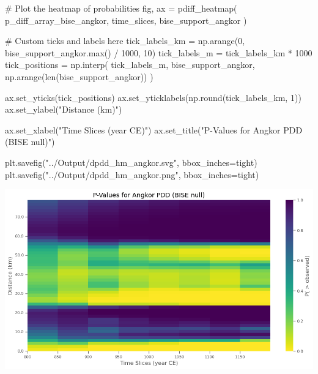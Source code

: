 \documentclass[
  11pt,
  letterpaper,
  DIV=11,
  numbers=noendperiod]{scrartcl}
\newenvironment{Shaded}{\begin{snugshade}}{\end{snugshade}}
\newcommand{\BuiltInTok}[1]{\textcolor[rgb]{0.00,0.23,0.31}{#1}}
\newcommand{\CommentTok}[1]{\textcolor[rgb]{0.37,0.37,0.37}{#1}}
\newcommand{\DecValTok}[1]{\textcolor[rgb]{0.68,0.00,0.00}{#1}}
\newcommand{\NormalTok}[1]{\textcolor[rgb]{0.00,0.23,0.31}{#1}}
\newcommand{\OperatorTok}[1]{\textcolor[rgb]{0.37,0.37,0.37}{#1}}
\newcommand{\StringTok}[1]{\textcolor[rgb]{0.13,0.47,0.30}{#1}}
\begin{document}
\begin{Shaded}
\begin{Highlighting}[]
\CommentTok{\# Plot the heatmap of probabilities}
\NormalTok{fig, ax }\OperatorTok{=}\NormalTok{ pdiff\_heatmap(}
\NormalTok{    p\_diff\_array\_bise\_angkor,}
\NormalTok{    time\_slices,}
\NormalTok{    bise\_support\_angkor}
\NormalTok{)}

\CommentTok{\# Custom ticks and labels here}
\NormalTok{tick\_labels\_km }\OperatorTok{=}\NormalTok{ np.arange(}\DecValTok{0}\NormalTok{, bise\_support\_angkor.}\BuiltInTok{max}\NormalTok{() }\OperatorTok{/} \DecValTok{1000}\NormalTok{, }\DecValTok{10}\NormalTok{)}
\NormalTok{tick\_labels\_m }\OperatorTok{=}\NormalTok{ tick\_labels\_km }\OperatorTok{*} \DecValTok{1000}
\NormalTok{tick\_positions }\OperatorTok{=}\NormalTok{ np.interp(}
\NormalTok{    tick\_labels\_m, }
\NormalTok{    bise\_support\_angkor, }
\NormalTok{    np.arange(}\BuiltInTok{len}\NormalTok{(bise\_support\_angkor))}
\NormalTok{)}

\NormalTok{ax.set\_yticks(tick\_positions)}
\NormalTok{ax.set\_yticklabels(np.}\BuiltInTok{round}\NormalTok{(tick\_labels\_km, }\DecValTok{1}\NormalTok{))}
\NormalTok{ax.set\_ylabel(}\StringTok{"Distance (km)"}\NormalTok{)}

\NormalTok{ax.set\_xlabel(}\StringTok{"Time Slices (year CE)"}\NormalTok{)}
\NormalTok{ax.set\_title(}\StringTok{"P{-}Values for Angkor PDD (BISE null)"}\NormalTok{)}

\NormalTok{plt.savefig(}\StringTok{"../Output/dpdd\_hm\_angkor.svg"}\NormalTok{, bbox\_inches}\OperatorTok{=}\StringTok{\textquotesingle{}tight\textquotesingle{}}\NormalTok{)}
\NormalTok{plt.savefig(}\StringTok{"../Output/dpdd\_hm\_angkor.png"}\NormalTok{, bbox\_inches}\OperatorTok{=}\StringTok{\textquotesingle{}tight\textquotesingle{}}\NormalTok{)}
\end{Highlighting}
\end{Shaded}

\includegraphics{analysis_files/figure-pdf/cell-14-output-1.png}
\end{document}
